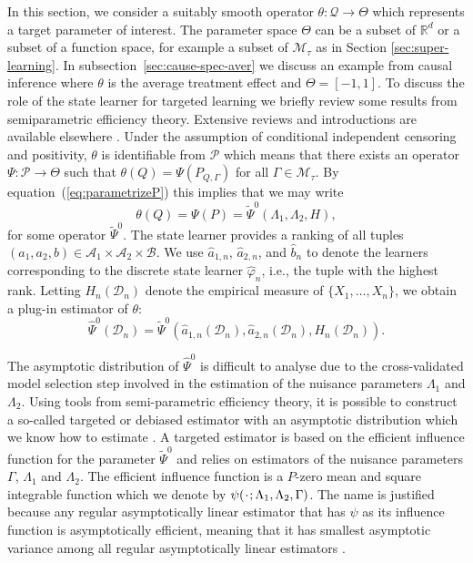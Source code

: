 \documentclass[11pt]{article}
\theoremstyle{thmstyleone}%
\theoremstyle{thmstyletwo}%
\theoremstyle{thmstylethree}%
\newcommand{\R}{\mathbb{R}}
\newcommand{\blank}{\makebox[1ex]{\textbf{$\cdot$}}}
\renewcommand{\phi}{\varphi}
\newcommand{\1}{\mathds{1}}
\newcommand{\data}{\ensuremath{\mathcal{D}}}
\begin{document}
In this section, we consider a suitably smooth operator
\( \theta \colon \mathcal{Q} \rightarrow \Theta \) which represents a
target parameter of interest. The parameter space $\Theta$ can be a
subset of \(\R^d\) or a subset of a function space, for example a
subset of \(\mathcal{M}_{\tau}\) as in Section
\ref{sec:super-learning}. In subsection~\ref{sec:cause-spec-aver} we
discuss an example from causal inference where $\theta$ is the average
treatment effect and \( \Theta = [-1,1] \).  To discuss the role of
the state learner for targeted learning we briefly review some results
from semiparametric efficiency theory. Extensive reviews and
introductions are available elsewhere
\cite[e.g.,][]{pfanzagl1985contributions,bickel1993efficient,van2003unified,tsiatis2007semiparametric,kennedy2016semiparametric}.
Under the assumption of conditional independent censoring and
positivity, $\theta$ is identifiable from \( \mathcal{P} \) which
means that there exists an operator
\( \Psi \colon \mathcal{P} \rightarrow \Theta \) such that
\( \theta(Q) = \Psi(P_{Q, \Gamma}) \) for all
$\Gamma \in \mathcal{M}_{\tau}$.  By equation~(\ref{eq:parametrizeP})
this implies that we may write
\begin{equation*}
  \theta(Q) = \Psi(P) = \tilde{\Psi}^0(\Lambda_1, \Lambda_2, H),
\end{equation*}
for some operator \( \tilde{\Psi}^0 \). The state learner provides a ranking of
all tuples
\( (a_1, a_2, b) \in \mathcal{A}_1 \times \mathcal{A}_2 \times \mathcal{B} \).
We use \( \hat{a}_{1,n} \), \( \hat{a}_{2,n} \), and \( \hat{b}_n \) to denote
the learners corresponding to the discrete state learner \( \hat{\phi}_n \),
i.e., the tuple with the highest rank. Letting \( H_n(\data_n) \) denote the
empirical measure of \( \{X_1, \dots, X_n\} \), we obtain a plug-in estimator of
$\theta$:
\begin{equation}
  \label{eq:2}
  \hat{\Psi}^0(\data_n) =
  \tilde{\Psi}^0(\hat{a}_{1,n}(\data_n), \hat{a}_{2,n}(\data_n), H_n(\data_n)). 
\end{equation}

The asymptotic distribution of \( \hat{\Psi}^0 \) is
difficult to analyse due to the cross-validated model selection step
involved in the estimation of the nuisance parameters $\Lambda_1$ and
$\Lambda_2$.
Using tools from semi-parametric efficiency theory, it is possible to
construct a so-called targeted or debiased estimator with an
asymptotic distribution which we know how to estimate
\citep{bickel1993efficient,van2011targeted,chernozhukov2018double}. A
targeted estimator is based on the efficient influence function for
the parameter $\tilde{\Psi}^0$ and relies on estimators of the
nuisance parameters $\Gamma$, \( \Lambda_1 \) and $\Lambda_2$. The
efficient influence function is a \( P \)-zero mean and square
integrable function which we denote by
\( \psi(\blank ; \Lambda_1, \Lambda_2, \Gamma) \). The name is
justified because any regular asymptotically linear estimator that has
\( \psi \) as its influence function is asymptotically efficient,
meaning that it has smallest asymptotic variance among all regular
asymptotically linear estimators \citep{bickel1993efficient}.
\end{document}
